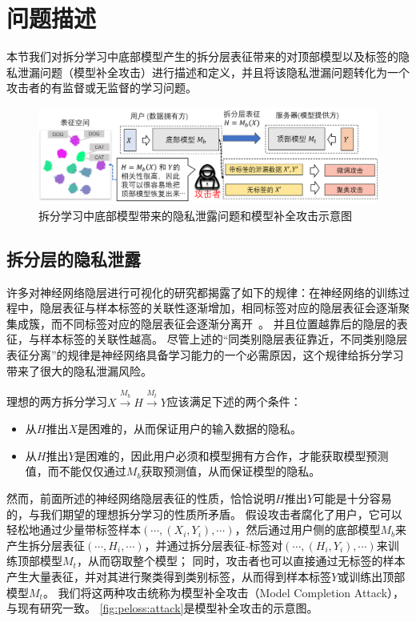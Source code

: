 \section{问题描述}
本节我们对拆分学习中底部模型产生的拆分层表征带来的对顶部模型以及标签的隐私泄漏问题（模型补全攻击）进行描述和定义，并且将该隐私泄漏问题转化为一个攻击者的有监督或无监督的学习问题。

\begin{figure}[h!]
    \centering
    \includegraphics[width=1\linewidth]{Z_Resources/peloss_attack.png}
    \caption{拆分学习中底部模型带来的隐私泄露问题和模型补全攻击示意图}
    \label{fig:peloss:attack}
\end{figure}

\subsection{拆分层的隐私泄露}
许多对神经网络隐层进行可视化的研究都揭露了如下的规律：在神经网络的训练过程中，隐层表征与样本标签的关联性逐渐增加，相同标签对应的隐层表征会逐渐聚集成簇，而不同标签对应的隐层表征会逐渐分离开~\cite{paulo2017visualize_hidden,pezzotti2017deepeyes,cantareira2020hidden_vector_fields}。
%
并且位置越靠后的隐层的表征，与样本标签的关联性越高。
%
尽管上述的“同类别隐层表征靠近，不同类别隐层表征分离”的规律是神经网络具备学习能力的一个必需原因，这个规律给拆分学习带来了很大的隐私泄漏风险。
%

理想的两方拆分学习$X \stackrel{M_b}{\to} H \stackrel{M_t}{\to} Y$应该满足下述的两个条件：
\begin{itemize}
    \item 从$H$推出$X$是困难的，从而保证用户的输入数据的隐私。
    \item 从$H$推出$Y$是困难的，因此用户必须和模型拥有方合作，才能获取模型预测值，而不能仅仅通过$M_b$获取预测值，从而保证模型的隐私。
\end{itemize}
然而，前面所述的神经网络隐层表征的性质，恰恰说明$H$推出$Y$可能是十分容易的，与我们期望的理想拆分学习的性质所矛盾。
%
假设攻击者腐化了用户，它可以轻松地通过少量带标签样本$(\cdots, (X_i, Y_i), \cdots)$，然后通过用户侧的底部模型$M_b$来产生拆分层表征$(\cdots, H_i, \cdots)$，并通过拆分层表征-标签对$(\cdots, (H_i, Y_i), \cdots)$来训练顶部模型$M_t$，从而窃取整个模型；
同时，攻击者也可以直接通过无标签的样本产生大量表征，并对其进行聚类得到类别标签，从而得到样本标签$Y$或训练出顶部模型$M_t$。
%
我们将这两种攻击统称为模型补全攻击（Model Completion Attack），与现有研究一致。
%
\autoref{fig:peloss:attack}是模型补全攻击的示意图。


